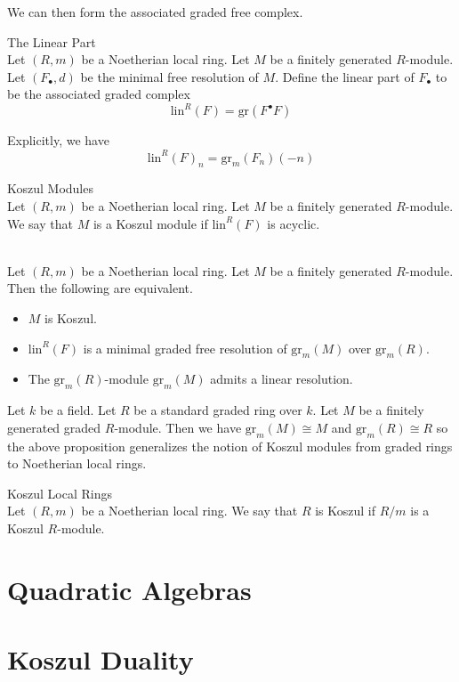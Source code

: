 \documentclass[a4paper]{article}
\begin{document}
We can then form the associated graded free complex. 

\begin{defn}{The Linear Part}{}\\
Let $(R,m)$ be a Noetherian local ring. Let $M$ be a finitely generated $R$-module. Let $(F_\bullet,d)$ be the minimal free resolution of $M$. Define the linear part of $F_\bullet$ to be the associated graded complex $$\text{lin}^R(F)=\text{gr}(F^\bullet F)$$
\end{defn}

Explicitly, we have $$\text{lin}^R(F)_n=\text{gr}_m(F_n)(-n)$$

\begin{defn}{Koszul Modules}{}\\
Let $(R,m)$ be a Noetherian local ring. Let $M$ be a finitely generated $R$-module. We say that $M$ is a Koszul module if $\text{lin}^R(F)$ is acyclic. 
\end{defn}

\begin{prp}{}{}\\
Let $(R,m)$ be a Noetherian local ring. Let $M$ be a finitely generated $R$-module. Then the following are equivalent. 
\begin{itemize}
\item $M$ is Koszul. 
\item $\text{lin}^R(F)$ is a minimal graded free resolution of $\text{gr}_m(M)$ over $\text{gr}_m(R)$. 
\item The $\text{gr}_m(R)$-module $\text{gr}_m(M)$ admits a linear resolution. 
\end{itemize}
\end{prp}

Let $k$ be a field. Let $R$ be a standard graded ring over $k$. Let $M$ be a finitely generated graded $R$-module. Then we have $\text{gr}_m(M)\cong M$ and $\text{gr}_m(R)\cong R$ so the above proposition generalizes the notion of Koszul modules from graded rings to Noetherian local rings. 

\begin{defn}{Koszul Local Rings}{}\\
Let $(R,m)$ be a Noetherian local ring. We say that $R$ is Koszul if $R/m$ is a Koszul $R$-module. 
\end{defn}

\pagebreak
\section{Quadratic Algebras}

\pagebreak
\section{Koszul Duality}
\end{document}
